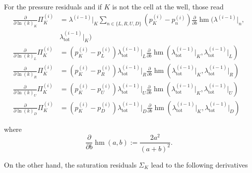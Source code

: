 \documentclass[conference]{IEEEtran}
\newcommand*{\pdiff}[2]{\ensuremath{\frac{\partial}{\partial{#2}}{#1}}}
\DeclareMathOperator*{\hmean}{hm}
\begin{document}
For the pressure residuals and if $K$ is not the cell at the well, those read\\
\begin{align}
\pdiff{\Pi_K^{(i)}}{\ln(k)_K} &= \lambda^{(i-1)}\lvert_K\sum_{n\in\{L, R, U, D\}} (p_K^{(i)} - p_n^{(i)})\pdiff{\hmean}{b}(\lambda^{(i-1)}\lvert_n,\\& \lambda_\text{tot}^{(i-1)}\lvert_K)\nonumber\\
\pdiff{\Pi_K^{(i)}}{\ln(k)_L} &= (p_K^{(i)} - p_L^{(i)})\lambda_\text{tot}^{(i-1)}\lvert_L \pdiff{\hmean}{b}(\lambda_\text{tot}^{(i-1)}\lvert_K, \lambda_\text{tot}^{(i-1)}\lvert_L) \\
\pdiff{\Pi_K^{(i)}}{\ln(k)_R} &= (p_K^{(i)} - p_R^{(i)})\lambda_\text{tot}^{(i-1)}\lvert_R \pdiff{\hmean}{b}(\lambda_\text{tot}^{(i-1)}\lvert_K, \lambda_\text{tot}^{(i-1)}\lvert_R) \\
\pdiff{\Pi_K^{(i)}}{\ln(k)_U} &= (p_K^{(i)} - p_U^{(i)})\lambda_\text{tot}^{(i-1)}\lvert_U \pdiff{\hmean}{b}(\lambda_\text{tot}^{(i-1)}\lvert_K, \lambda_\text{tot}^{(i-1)}\lvert_U) \\
\pdiff{\Pi_K^{(i)}}{\ln(k)_D} &= (p_K^{(i)} - p_D^{(i)})\lambda_\text{tot}^{(i-1)}\lvert_D \pdiff{\hmean}{b}(\lambda_\text{tot}^{(i-1)}\lvert_K, \lambda_\text{tot}^{(i-1)}\lvert_D)
\end{align}

where 
\begin{equation}
\pdiff{\hmean}{b}(a, b) := \frac{2a^2}{(a+b)^2}.
\end{equation}

On the other hand, the saturation residuals $\Sigma_K$ lead to the following derivatives
\end{document}
